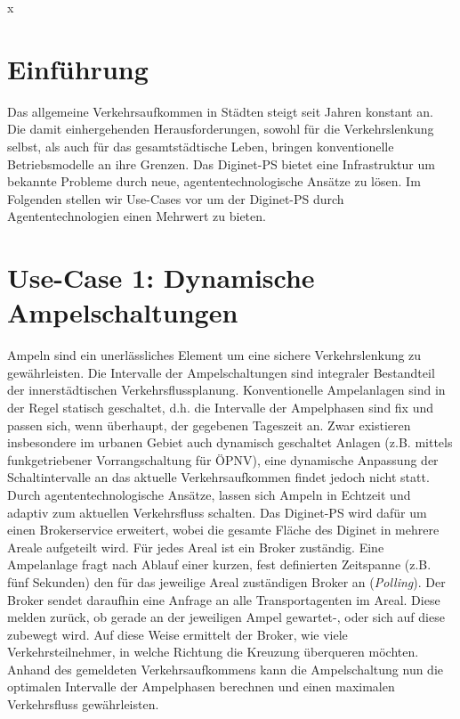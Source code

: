 x\section{Einführung}

Das allgemeine Verkehrsaufkommen in Städten steigt seit Jahren konstant an. Die damit einhergehenden Herausforderungen, sowohl für die Verkehrslenkung selbst, als auch für das gesamtstädtische Leben, bringen konventionelle Betriebsmodelle an ihre Grenzen. Das Diginet-PS bietet eine Infrastruktur um bekannte Probleme durch neue, agententechnologische Ansätze zu lösen. Im Folgenden stellen wir Use-Cases vor um der Diginet-PS durch Agententechnologien einen Mehrwert zu bieten.

\section*{Use-Case 1: Dynamische Ampelschaltungen}

Ampeln sind ein unerlässliches Element um eine sichere Verkehrslenkung zu gewährleisten. Die Intervalle der Ampelschaltungen sind integraler Bestandteil der innerstädtischen Verkehrsflussplanung. Konventionelle Ampelanlagen sind in der Regel statisch geschaltet, d.h. die Intervalle der Ampelphasen sind fix und passen sich, wenn überhaupt, der gegebenen Tageszeit an. Zwar existieren insbesondere im urbanen Gebiet auch dynamisch geschaltet Anlagen (z.B. mittels funkgetriebener Vorrangschaltung für ÖPNV), eine dynamische Anpassung der Schaltintervalle an das aktuelle Verkehrsaufkommen findet jedoch nicht statt. \\

Durch agententechnologische Ansätze, lassen sich Ampeln in Echtzeit und adaptiv zum aktuellen Verkehrsfluss schalten. Das Diginet-PS wird dafür um einen Brokerservice erweitert, wobei die gesamte Fläche des Diginet in mehrere Areale aufgeteilt wird. Für jedes Areal ist ein Broker zuständig. Eine Ampelanlage fragt nach Ablauf einer kurzen, fest definierten Zeitspanne (z.B. fünf Sekunden) den für das jeweilige Areal zuständigen Broker an (\textit{Polling}). Der Broker sendet daraufhin eine Anfrage an alle Transportagenten im Areal. Diese melden zurück, ob gerade an der jeweiligen Ampel gewartet-, oder sich auf diese zubewegt wird. Auf diese Weise ermittelt der Broker, wie viele Verkehrsteilnehmer, in welche Richtung die Kreuzung überqueren möchten. Anhand des gemeldeten Verkehrsaufkommens kann die Ampelschaltung nun die optimalen Intervalle der Ampelphasen berechnen und einen maximalen Verkehrsfluss gewährleisten.\\

